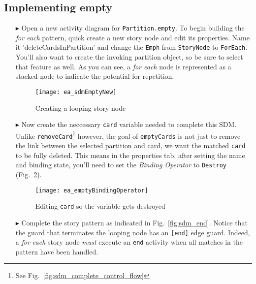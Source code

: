 \newpage
\subsection{Implementing empty}
\visHeader
\hypertarget{emptyPartition vis}{}

\begin{itemize}

\item[$\blacktriangleright$] Open a new activity diagram for \texttt{Partition.empty}. To begin building the \emph{for each} pattern, quick create a new story
node and edit its properties. Name it 'deleteCardsInPartition' and change the \texttt{Emph} from \texttt{StoryNode} to \texttt{ForEach}. You'll also want to
create the invoking partition object, so be sure to select that feature as well. As you can see, a \emph{for each} node is represented  as a stacked node to
indicate the potential for repetition.

\begin{figure}[htbp]
\begin{center}
  \texttt{[image: ea\_sdmEmptyNew]}
  \caption{Creating a looping story node}  
  \label{fig:sdm_foreach}
\end{center}
\end{figure}

\item[$\blacktriangleright$] Now create the neccessary \texttt{card} variable needed to complete this SDM. Unlike \texttt{removeCard}\footnote{See
Fig.~\ref{fig:sdm_complete_control_flow}} however, the goal of \texttt{emptyCards} is not just to remove the link between the selected partition and card, we
want the matched \texttt{card} to be fully deleted. This means in the properties tab, after setting the name and binding state, you'll need to set the \emph{Binding
Operator} to \texttt{Destroy} (Fig.~\ref{fig:sdm_bindingOperator}).

\begin{figure}[htbp]
\begin{center}
  \texttt{[image: ea\_emptyBindingOperator]}
  \caption{Editing \texttt{card} so the variable gets destroyed}  
  \label{fig:sdm_bindingOperator}
\end{center}
\end{figure}

\item[$\blacktriangleright$] Complete the story pattern as indicated in Fig.~\ref{fig:sdm_end}. Notice that the guard that terminates the looping node has an
\texttt{[end]} edge guard. Indeed, a \emph{for each} story node \emph{must} execute an \texttt{end} activity when all matches in the pattern have been
handled.


\end{itemize}
